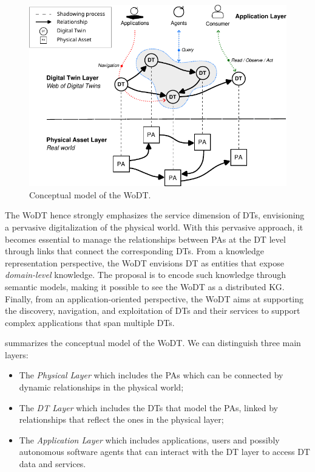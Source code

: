 \begin{figure}[t]
    \centering
    \includegraphics[width=\textwidth]{figures/wodt.pdf}
    \caption{Conceptual model of the \acl{WoDT}.}
    \label{fig:dt-wodt-model}
\end{figure}

The \ac{WoDT} hence strongly emphasizes the service dimension of \acp{DT}, envisioning a pervasive digitalization of the physical world.
%
With this pervasive approach, it becomes essential to manage the relationships between \acp{PA} at the \ac{DT} level through links that connect the corresponding \acp{DT}.
%
From a knowledge representation perspective, the \ac{WoDT} envisions \ac{DT} as entities that expose \emph{domain-level} knowledge.
%
The proposal is to encode such knowledge through semantic models, making it possible to see the \ac{WoDT} as a distributed \ac{KG}.
%
Finally, from an application-oriented perspective, the \ac{WoDT} aims at supporting the discovery, navigation, and exploitation of \acp{DT} and their services to support complex applications that span multiple \acp{DT}.

 summarizes the conceptual model of the \ac{WoDT}.
%
We can distinguish three main layers:
\begin{itemize}
    \item The \emph{Physical Layer} which includes the \acp{PA} which can be connected by dynamic relationships in the physical world;
    \item The \emph{\acl{DT} Layer} which includes the \acp{DT} that model the \acp{PA}, linked by relationships that reflect the ones in the physical layer;
    \item The \emph{Application Layer} which includes applications, users and possibly autonomous software agents that can interact with the \ac{DT} layer to access \ac{DT} data and services.
\end{itemize}

